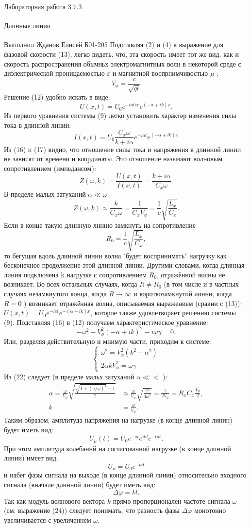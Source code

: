 \documentclass{astroedu-lab}
\begin{document}
\begin{problem}{\huge Лабораторная работа 3.7.3\\\\Длинные линии\\\\Выполнил Жданов Елисей Б01-205}
Подставляя (2) и (4) в выражение для фазовой скорости (13), легко видеть, что, эта скорость нмеет тот же вид, как и скорость распространения обычньх электромагнитных волн в некоторой среде с диэлектрической проницаемостью $\varepsilon$ и магнитной воспрнимчивостью $\mu$ :
$$
V_\phi=\frac{c}{\sqrt{q l}}
$$
Решение (12) удобно искать в виде:
$$
U(x, t)=U_0 e^{-i a t e r} e^{(-\alpha+i k) x} .
$$
Из первого уравнения системы (9) легко установить характер изменения силы тока в длинной линии:
$$
I(x, t)=U_0 \frac{C_x \omega}{k+i \alpha} e^{-i a t} e^{(-\alpha+i k) x}
$$
Из (16) и (17) видно, что отношение силы тока и напряжения в длинной линии не зависят от времени и координаты. Это отношение называют волновым сопротивлением (импедансом):
$$
Z(\omega, k)=\frac{U(x, t)}{I(x, t)}=\frac{k+i \alpha}{C_x \omega} .
$$
В пределе малых затуханий $\alpha \ll \omega$
$$
Z(\omega, k) \approx \frac{k}{C_x \omega}=\frac{1}{C_x V_\phi}=\frac{1}{c} \sqrt{\frac{L_x}{C_x}} .
$$
Если в конце такую длинную лннню замкнуть на сопротивление
$$
R_0=\frac{1}{c} \sqrt{\frac{L_x}{C_x}},
$$
то бегущая вдоль длинной линни волна "будет воспринимать" нагрузку как бесконечное продолжение этой длинной линии. Другими словами, когда длинная линия подключена $\mathrm{k}$ нагрузке с сопротивлением $R_0$, отражённой волны не возникает. Во всех остальных случаях, когда $R \neq R_0$ (в том числе и в частных случаях незамкнутого конца, когда $R \rightarrow \infty$ и короткозамкнутой линни, когда $R=0$ ) возникает отражённая волна, описываемая выражением (сравни с (13)):
$U(x, t)=U_0 e^{-i e t} e^{-(\alpha+i k) x}$, которое также удовлетворяет решенню системы (9).
Подставляя (16) в (12) получаем характеристическое уравнение:
$$
-\omega^2-V_\phi^2(-\alpha+i k)^2-i \omega \gamma=0 .
$$
Или, разделяя действительную и мнимую части, приходим к системе:
$$
\left\{\begin{array}{l}
\omega^2=V_\phi^2\left(k^2-\alpha^2\right) \\
2 \alpha k V_\phi^2=\omega \gamma
\end{array}\right.
$$
Из (22) следует (в пределе мальх затуханий $\alpha \ll<$ ):
$$
\begin{aligned}
\alpha=\frac{\omega}{V_\phi} \sqrt{\frac{\sqrt{1+(\gamma / \omega)^2}-1}{2}} & \approx \frac{\omega}{V_\phi} \sqrt{\frac{\gamma^2}{4 \omega^2}}=\frac{\gamma}{2 V_\phi}=R_x C_x \frac{V_\phi}{2}, \\
k & =\frac{\omega}{V_\phi} .
\end{aligned}
$$
Таким образом, амплитуда напряжения на нагрузке (в конце длинной линин) будет иметь вид:
$$
U_\mu(t)=U_0 e^{-a l} e^{i l d} e^{-t a t} .
$$
При этом амплитуда колебаннй на согласованной нагрузке (в конце длинной линии) имеет вид:
$$
U_n=U_0 e^{-a d}
$$
и набег фазы сигнала на выходе (в конце длинной линии) относительно входного сигнала (вначале длннной линии) будет иметь вид:
$$
\Delta \varphi=k l .
$$
Так как модуль волнового вектора $k$ прямо пропорционален частоте сигнала $\omega$ (см. выражение (24)) следует понимать, что разность фазы $\Delta \varphi$ монотонно увеличивается с увеличеннем $\omega$.


\end{problem}
\end{document}
